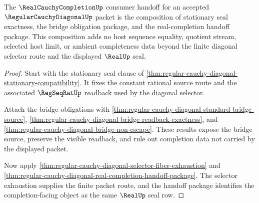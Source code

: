 \begin{theorem}
\label{thm:regular-cauchy-diagonal-completion-seal-composition}
The $\RealCauchyCompletionUp$ consumer handoff for an accepted $\RegularCauchyDiagonalUp$ packet is the composition of stationary seal exactness, the bridge obligation package, and the real-completion handoff package. This composition adds no host sequence equality, quotient stream, selected host limit, or ambient completeness data beyond the finite diagonal selector route and the displayed $\RealUp$ seal.
\end{theorem}
\begin{proof}
Start with the stationary seal clause of \autoref{thm:regular-cauchy-diagonal-stationary-compatibility}. It fixes the constant rational source route and the associated $\RegSeqRatUp$ readback used by the diagonal selector.

Attach the bridge obligations with \autoref{thm:regular-cauchy-diagonal-standard-bridge-source}, \autoref{thm:regular-cauchy-diagonal-bridge-readback-exactness}, and \autoref{thm:regular-cauchy-diagonal-bridge-non-escape}. These results expose the bridge source, preserve the visible readback, and rule out completion data not carried by the displayed packet.

Now apply \autoref{thm:regular-cauchy-diagonal-selector-fiber-exhaustion} and \autoref{thm:regular-cauchy-diagonal-real-completion-handoff-package}. The selector exhaustion supplies the finite packet route, and the handoff package identifies the completion-facing object as the same $\RealUp$ seal row.
\end{proof}

